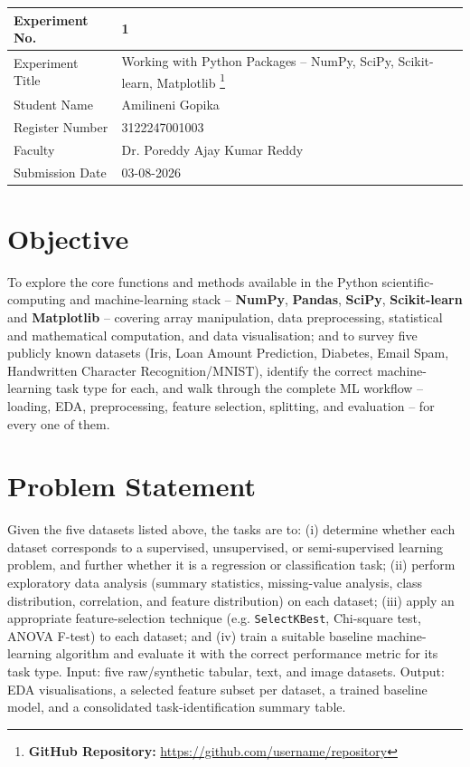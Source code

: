 \documentclass[12pt,a4paper]{article}
\begin{document}
\begin{tabular}{|p{4cm}|p{11cm}|}
\hline
Experiment No. & 1 \\ \hline
Experiment Title & Working with Python Packages -- NumPy, SciPy, Scikit-learn, Matplotlib
\footnote{\textbf{GitHub Repository: }\url{https://github.com/username/repository}}\\ \hline
Student Name & Amilineni Gopika\\ \hline
Register Number & 3122247001003\\ \hline
Faculty & Dr. Poreddy Ajay Kumar Reddy \\ \hline
Submission Date & 03-08-2026 \\ \hline
\end{tabular}

\section{Objective}
To explore the core functions and methods available in the Python scientific-computing and
machine-learning stack -- \textbf{NumPy}, \textbf{Pandas}, \textbf{SciPy}, \textbf{Scikit-learn}
and \textbf{Matplotlib} -- covering array manipulation, data preprocessing, statistical and
mathematical computation, and data visualisation; and to survey five publicly known datasets
(Iris, Loan Amount Prediction, Diabetes, Email Spam, Handwritten Character Recognition/MNIST),
identify the correct machine-learning task type for each, and walk through the complete ML
workflow -- loading, EDA, preprocessing, feature selection, splitting, and evaluation -- for
every one of them.

\section{Problem Statement}
Given the five datasets listed above, the tasks are to: (i) determine whether each dataset
corresponds to a supervised, unsupervised, or semi-supervised learning problem, and further
whether it is a regression or classification task; (ii) perform exploratory data analysis
(summary statistics, missing-value analysis, class distribution, correlation, and feature
distribution) on each dataset; (iii) apply an appropriate feature-selection technique
(e.g. \texttt{SelectKBest}, Chi-square test, ANOVA F-test) to each dataset; and (iv) train a
suitable baseline machine-learning algorithm and evaluate it with the correct performance
metric for its task type. Input: five raw/synthetic tabular, text, and image datasets. Output:
EDA visualisations, a selected feature subset per dataset, a trained baseline model, and a
consolidated task-identification summary table.
\end{document}
